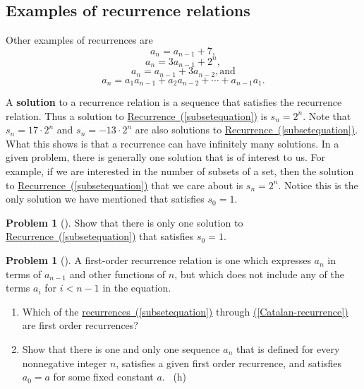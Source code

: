 \documentclass[10pt,]{book}
\newcommand{\terminology}[1]{\textbf{#1}}
\theoremstyle{plain}
\theoremstyle{definition}
\newtheorem{activity}[project]{Problem}
\theoremstyle{definition}
\numberwithin{equation}{chapter}
\newcommand{\lt}{<}
\begin{document}
\subsection[{Examples of recurrence relations}]{Examples of recurrence relations}\label{subsection-17}
\hypertarget{p-546}{}%
Other examples of recurrences are%
\begin{equation}
a_n = a_{n-1} +
7,\label{arithmeticexample}
\end{equation}
%
\begin{equation}
a_n =3a_{n-1} + 2^n,\label{geometricdriven}
\end{equation}
%
\begin{equation}
a_n = a_{n-1} + 3a_{n-2},\mbox{
and}\label{secondorderlinear}
\end{equation}
%
\begin{equation}
a_n= a_1a_{n-1} + a_2a_{n-2}+\cdots +
a_{n-1}a_1.\label{Catalan-recurrence}
\end{equation}
%
\par
\hypertarget{p-547}{}%
A \terminology{solution} to a recurrence relation is a sequence that satisfies the recurrence relation. Thus a solution to \hyperref[subsetequation]{Recurrence~(\ref{subsetequation})} is \(s_n =2^n\). Note that \(s_n=17\cdot2^n\) and \(s_n=-13\cdot2^n\) are also solutions to \hyperref[subsetequation]{Recurrence~(\ref{subsetequation})}. What this shows is that a recurrence can have infinitely many solutions. In a given problem, there is generally one solution that is of interest to us. For example, if we are interested in the number of subsets of a set, then the solution to \hyperref[subsetequation]{Recurrence~(\ref{subsetequation})} that we care about is \(s_n=2^n\). Notice this is the only solution we have mentioned that satisfies \(s_0=1\).%
\begin{activity}[]\marginsymbol[-1em]{} \label{activity-89}
\hypertarget{p-548}{}%
Show that there is only one solution to \hyperref[subsetequation]{Recurrence~(\ref{subsetequation})} that satisfies \(s_0=1\).%
\end{activity}
\begin{activity}[]\marginsymbol[-1em]{} \label{activity-90}
\hypertarget{p-550}{}%
A first-order recurrence relation is one which expresses \(a_n\) in terms of \(a_{n-1}\) and other functions of \(n\), but which does not include any of the terms \(a_i\) for \(i\lt n-1\) in the equation.%
\begin{enumerate}[font=\bfseries,label=(\alph*),ref=\alph*]
\item\label{task-87} \marginsymbol[-2.5em]{} \hypertarget{p-551}{}%
Which of the \hyperref[subsetequation]{recurrences~(\ref{subsetequation})} through \hyperref[Catalan-recurrence]{(\ref{Catalan-recurrence})} are first order recurrences?%
\item\label{task-88} \marginsymbol[-2.5em]{} \hypertarget{p-553}{}%
Show that there is one and only one sequence \(a_n\) that is defined for every nonnegative integer \(n\), satisfies a given first order recurrence, and satisfies \(a_0=a\) for some fixed constant \(a\).%
~{\tiny (h)}\end{enumerate}
\end{activity}
\end{document}
